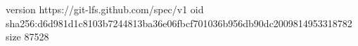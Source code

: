 version https://git-lfs.github.com/spec/v1
oid sha256:d6d981d1c8103b7244813ba36e06fbcf701036b956db90dc2009814953318782
size 87528
